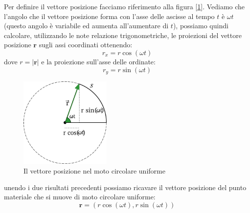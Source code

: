 \documentclass[a4paper,10pt,oneside]{article}
\begin{document}
Per definire il vettore posizione facciamo riferimento alla figura [\ref{fig:vet_posizione}]. Vediamo che l'angolo che il vettore posizione forma con l'asse delle ascisse al tempo $t$ è $\omega t$ (questo angolo è variabile ed aumenta all'aumentare di $t$), possiamo quindi calcolare, utilizzando le note relazione trigonometriche, le proiezioni del vettore posizione $\mathbf{r}$ sugli assi coordinati ottenendo:
\begin{equation}
 r_x=r\cos(\omega t)
\end{equation}
dove $r=|\mathbf{r}|$ e la proiezione sull'asse delle ordinate:
\begin{equation}
 r_y=r\sin(\omega t)
\end{equation}


\begin{figure}[H]
\begin{center}
 \includegraphics[width=0.4\textwidth]{./immagini/vet_posizione.png}
 \caption{Il vettore posizione nel moto circolare uniforme}
 \label{fig:vet_posizione}
\end{center}
\end{figure}

unendo i due risultati precedenti possiamo ricavare il vettore posizione del punto materiale che si muove di moto circolare uniforme:
\begin{equation}
 \mathbf{r}=\left(r\cos(\omega t),r\sin(\omega t)\right)
\end{equation}
\end{document}
